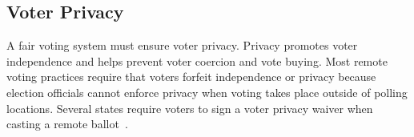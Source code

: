 \subsection{Voter Privacy}

A fair voting system must ensure voter privacy. Privacy promotes voter
independence and helps prevent voter coercion and vote buying. Most
remote voting practices require that voters forfeit independence or
privacy because election officials cannot enforce privacy when voting
takes place outside of polling locations. Several states require
voters to sign a voter privacy waiver when casting a remote
ballot~\cite{smithtime}.


